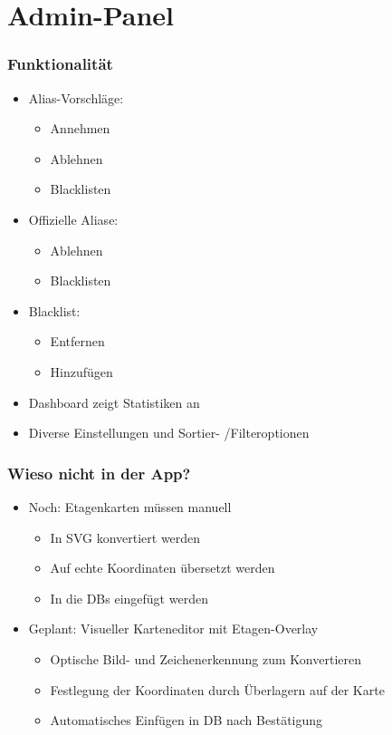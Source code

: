 \section{Admin-Panel}

\begin{frame}\frametitle{Funktionalität}
    \begin{itemize}
        \item Alias-Vorschläge: \begin{itemize}
            \item Annehmen
            \item Ablehnen
            \item Blacklisten
        \end{itemize}
        \item Offizielle Aliase: \begin{itemize}
            \item Ablehnen
            \item Blacklisten
        \end{itemize}
        \item Blacklist: \begin{itemize}
            \item Entfernen
            \item Hinzufügen
        \end{itemize}
        \item Dashboard zeigt Statistiken an
        \item Diverse Einstellungen und Sortier- /Filteroptionen
    \end{itemize}
\end{frame}

\begin{frame}\frametitle{Wieso nicht in der App?}
    \begin{itemize}
        \item Noch: Etagenkarten müssen manuell \begin{itemize}
            \item In SVG konvertiert werden
            \item Auf echte Koordinaten übersetzt werden
            \item In die DBs eingefügt werden
        \end{itemize}
        \item Geplant: Visueller Karteneditor mit Etagen-Overlay \begin{itemize}
            \item Optische Bild- und Zeichenerkennung zum Konvertieren
            \item Festlegung der Koordinaten durch Überlagern auf der Karte
            \item Automatisches Einfügen in DB nach Bestätigung   
        \end{itemize}
    \end{itemize}
\end{frame}
